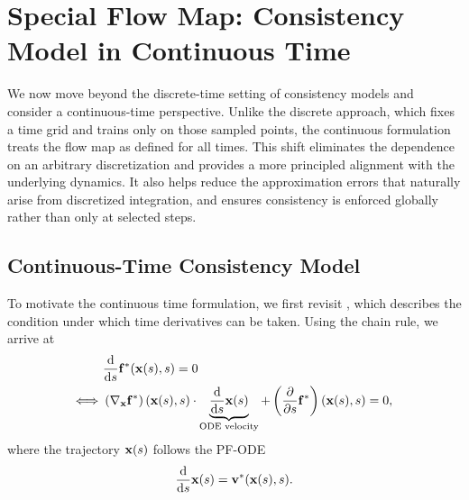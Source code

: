 






\clearpage
\newpage

\section{Special Flow Map: Consistency Model in Continuous Time}\label{sec:conti-cm}

We now move beyond the discrete-time setting of consistency models and consider
a continuous-time perspective. Unlike the discrete approach, which fixes a time
grid and trains only on those sampled points, the continuous formulation treats
the flow map as defined for all times. This shift eliminates the dependence on
an arbitrary discretization and provides a more principled alignment with the
underlying dynamics. It also helps reduce the approximation errors that
naturally arise from discretized integration, and ensures consistency is
enforced globally rather than only at selected steps.

\subsection{Continuous-Time Consistency Model}\label{subsec:conti-ct}
To motivate the continuous time formulation, we first revisit
, which describes the condition under which time derivatives
can be taken. Using the chain rule, we arrive at
\begin{align}\label{eq:conti-ct-motivation}
\begin{aligned}
        &\frac{\mathop{}\!\mathrm{d} }{\mathop{}\!\mathrm{d} s} {\mathbf{f}}^*({\mathbf{x}}(s), s) = 0 \\
    \Longleftrightarrow\,\, 
    &\left(\nabla_{{\mathbf{x}}} {\mathbf{f}}^*\right)({\mathbf{x}}(s), s) \cdot 
    \underbrace{\frac{\mathop{}\!\mathrm{d} }{\mathop{}\!\mathrm{d} s} {\mathbf{x}}(s)}_{\text{ODE velocity}} + 
    \left(\frac{\partial }{\partial s} {\mathbf{f}}^*\right)({\mathbf{x}}(s), s) = 0,
\end{aligned}
\end{align}
where the trajectory ${\mathbf{x}}(s)$ follows the PF-ODE
\begin{align*}
    \frac{\mathop{}\!\mathrm{d} }{\mathop{}\!\mathrm{d} s}{\mathbf{x}}(s) =  {\mathbf{v}}^*({\mathbf{x}}(s), s).
\end{align*}

